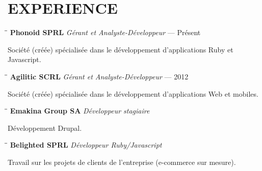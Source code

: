 \section{EXPERIENCE}

\vspace{0.50cm}


\begin{tabbing}
  \hspace{2.3in}\= \hspace{2.6in}\= \kill
  \textbf{Phonoid SPRL} \>\emph{Gérant et Analyste-Développeur}  — Présent\\
\end{tabbing}\vspace{-30pt}

Société (créée) spécialisée dans le développement d’applications Ruby et Javascript.


\begin{tabbing}
  \hspace{2.3in}\= \hspace{2.6in}\= \kill
  \textbf{Agilitic SCRL} \>\emph{Gérant et Analyste-Développeur}  — 2012\\
\end{tabbing}\vspace{-30pt}

Société (créée) spécialisée dans le développement d’applications Web et mobiles.


\begin{tabbing}
  \hspace{2.3in}\= \hspace{2.6in}\= \kill
  \textbf{Emakina Group SA} \>\emph{Développeur stagiaire} \\
\end{tabbing}\vspace{-30pt}

Développement Drupal.


\begin{tabbing}
  \hspace{2.3in}\= \hspace{2.6in}\= \kill
  \textbf{Belighted SPRL} \>\emph{Développeur Ruby/Javascript} \\
\end{tabbing}\vspace{-30pt}

Travail sur les projets de clients de l'entreprise (e-commerce sur mesure).

